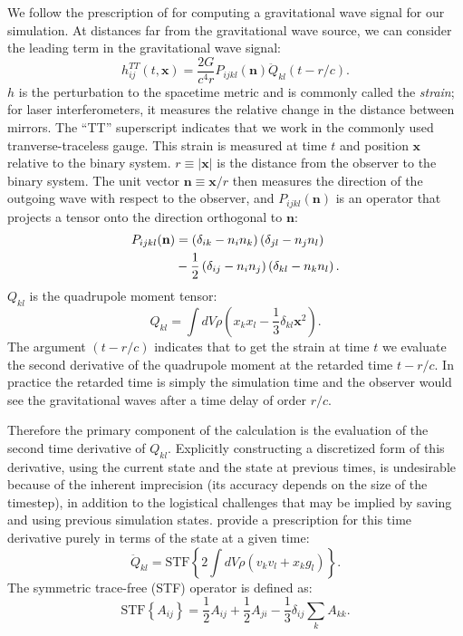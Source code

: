 \documentclass[12pt]{article}
\begin{document}
We follow the prescription of \citet{blanchet:1990} for computing a gravitational wave 
signal for our simulation. At distances far from the 
gravitational wave source, we can consider the leading term in the gravitational 
wave signal:
\begin{equation}
  h^{TT}_{ij}(t,\mathbf{x}) = \frac{2G}{c^4 r}P_{ijkl}(\mathbf{n}) \ddot{Q}_{kl}(t - r/c).
\end{equation}
$h$ is the perturbation to the spacetime metric and is commonly called the \textit{strain}; 
for laser interferometers, it measures the relative change in the distance between mirrors. 
The ``TT'' superscript indicates that we work in the commonly used tranverse-traceless gauge.
This strain is measured at time $t$ and position $\mathbf{x}$ relative to the binary system.
$r\equiv |\mathbf{x}|$ is the distance from the observer to the binary system. The unit vector 
$\mathbf{n} \equiv \mathbf{x} / r$ then measures the direction of the outgoing wave with 
respect to the observer, and $P_{ijkl}(\mathbf{n})$ is an operator that projects a tensor 
onto the direction orthogonal to $\mathbf{n}$:
\begin{align}
  P_{ijkl}(\mathbf{n}) &= \left(\delta_{ik} - n_i n_k\right)\left(\delta_{jl} - n_j n_l\right) \notag \\
                      &- \frac{1}{2}\left(\delta_{ij} - n_i n_j\right)\left( \delta_{kl} - n_k n_l\right).
\end{align}
$Q_{kl}$ is the quadrupole moment tensor:
\begin{equation}
  Q_{kl} = \int dV \rho \left(x_k x_l - \frac{1}{3}\delta_{kl} \mathbf{x}^2\right).
\end{equation}
The argument $(t - r/c)$ indicates that to get the strain at time $t$ we evaluate the second derivative of the 
quadrupole moment at the retarded time $t - r/c$. In practice the retarded time is simply the simulation time
and the observer would see the gravitational waves after a time delay of order $r/c$.

Therefore the primary component of the calculation is the evaluation of the second time derivative of $Q_{kl}$.
Explicitly constructing a discretized form of this derivative, using the current state and the state at 
previous times, is undesirable because of the inherent imprecision (its accuracy depends on the size of the timestep),
in addition to the logistical challenges that may be implied by saving and using previous simulation states. 
\citet{blanchet:1990} provide a prescription for this time derivative purely in terms of the state at a given time:
\begin{equation}
  \ddot{Q}_{kl} = \text{STF}\left\{2\int dV \rho (v_k v_l + x_k g_l)\right\}.
\end{equation}
The symmetric trace-free (STF) operator is defined as:
\begin{equation}
  \text{STF}\left\{A_{ij}\right\} = \frac{1}{2}A_{ij} + \frac{1}{2}A_{ji} - \frac{1}{3} \delta_{ij} \sum_{k}A_{kk}.
\end{equation}
\end{document}
